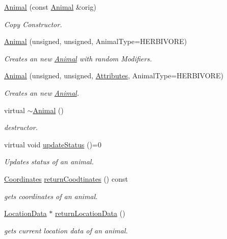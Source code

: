 \begin{DoxyCompactItemize}
\item 
\hyperlink{class_animal_ab26f5f62b5194201e0b07729bde2f5dc}{Animal} (const \hyperlink{class_animal}{Animal} \&orig)
\begin{DoxyCompactList}\small\item\em Copy Constructor. \end{DoxyCompactList}\item 
\hyperlink{class_animal_af84c9e041ddd20710ef3412d415e68a8}{Animal} (unsigned, unsigned, Animal\+Type=H\+E\+R\+B\+I\+V\+O\+R\+E)
\begin{DoxyCompactList}\small\item\em Creates an new \hyperlink{class_animal}{Animal} with random Modifiers. \end{DoxyCompactList}\item 
\hyperlink{class_animal_a232b2b3551f7161e100fd1b508accbcd}{Animal} (unsigned, unsigned, \hyperlink{class_attributes}{Attributes}, Animal\+Type=H\+E\+R\+B\+I\+V\+O\+R\+E)
\begin{DoxyCompactList}\small\item\em Creates an new \hyperlink{class_animal}{Animal}. \end{DoxyCompactList}\item 
virtual \hyperlink{class_animal_a476af25adde5f0dfa688129c8f86fa5c}{$\sim$\+Animal} ()
\begin{DoxyCompactList}\small\item\em destructor. \end{DoxyCompactList}\item 
virtual void \hyperlink{class_animal_acd9cdd1e77d0e1c54b2601aa52865b90}{update\+Status} ()=0
\begin{DoxyCompactList}\small\item\em Updates status of an animal. \end{DoxyCompactList}\item 
\hyperlink{struct_coordinates}{Coordinates} \hyperlink{class_animal_aacc92184b295e2599bfe4143c107b1c0}{return\+Coodtinates} () const 
\begin{DoxyCompactList}\small\item\em gets coordinates of an animal. \end{DoxyCompactList}\item 
\hyperlink{struct_location_data}{Location\+Data} $\ast$ \hyperlink{class_animal_af354475eac6d2f1edb0822d8ee3953df}{return\+Location\+Data} ()
\begin{DoxyCompactList}\small\item\em gets current location data of an animal. \end{DoxyCompactList}\item 

\end{DoxyCompactItemize}
